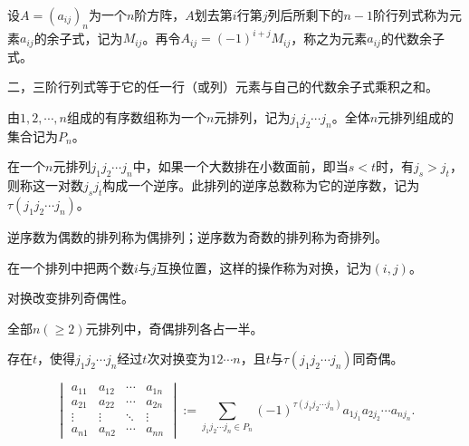 \begin{Def}
设$A = (a_{ij})_n$为一个$n$阶方阵，$A$划去第$i$行第$j$列后所剩下的$n-1$阶行列式称为元素$a_{ij}$的余子式，记为$M_{ij}$。再令$A_{ij} = (-1)^{i+j}M_{ij}$，称之为元素$a_{ij}$的代数余子式。
\end{Def}

\begin{thm}
二，三阶行列式等于它的任一行（或列）元素与自己的代数余子式乘积之和。
\end{thm}

\begin{Def}
由$1,2,\cdots,n$组成的有序数组称为一个$n$元排列，记为$j_1j_2\cdots j_n$。全体$n$元排列组成的集合记为$P_n$。
\end{Def}

\begin{Def}
在一个$n$元排列$j_1j_2\cdots j_n$中，如果一个大数排在小数面前，即当$s<t$时，有$j_s>j_t$，则称这一对数$j_sj_t$构成一个逆序。此排列的逆序总数称为它的逆序数，记为$\tau(j_1j_2\cdots j_n)$。
\end{Def}

\begin{Def}
逆序数为偶数的排列称为偶排列；逆序数为奇数的排列称为奇排列。
\end{Def}

\begin{Def}
在一个排列中把两个数$i$与$j$互换位置，这样的操作称为对换，记为$(i, j)$。
\end{Def}

\begin{thm}
对换改变排列奇偶性。
\end{thm}

\begin{cor}
全部$n(\geqslant 2)$元排列中，奇偶排列各占一半。
\end{cor}

\begin{cor}
存在$t$，使得$j_1j_2\cdots j_n$经过$t$次对换变为$12\cdots n$，且$t$与$\tau(j_1j_2\cdots j_n)$同奇偶。
\end{cor}

\begin{Def}[$n$阶行列式]
$$\begin{vmatrix}
a_{11} & a_{12} & \cdots & a_{1n} \\ a_{21} & a_{22} & \cdots & a_{2n} \\ \vdots & \vdots & \ddots & \vdots \\ a_{n1} & a_{n2} & \cdots & a_{nn}
\end{vmatrix} := \sum\limits_{j_1j_2\cdots j_n \in P_n} (-1)^{\tau(j_1j_2\cdots j_n)} a_{1j_1}a_{2j_2}\cdots a_{nj_n}.$$
\end{Def}

